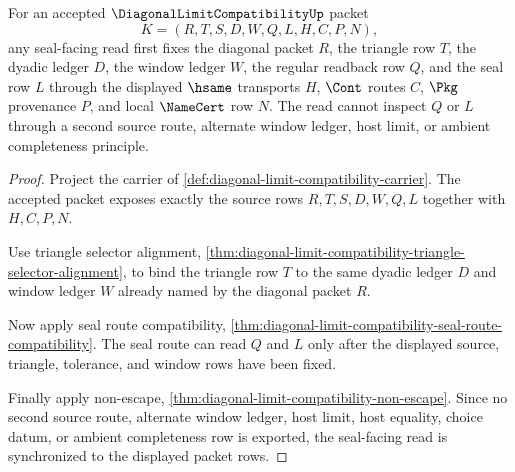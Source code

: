 \begin{theorem}
\label{thm:diagonal-limit-compatibility-seal-source-synchronization}
For an accepted $\DiagonalLimitCompatibilityUp$ packet
$$
K=(R,T,S,D,W,Q,L,H,C,P,N),
$$
any seal-facing read first fixes the diagonal packet $R$, the triangle row
$T$, the dyadic ledger $D$, the window ledger $W$, the regular readback row
$Q$, and the seal row $L$ through the displayed $\hsame$ transports $H$,
$\Cont$ routes $C$, $\Pkg$ provenance $P$, and local $\NameCert$ row $N$.
The read cannot inspect $Q$ or $L$ through a second source route, alternate
window ledger, host limit, or ambient completeness principle.
\end{theorem}
\begin{proof}
Project the carrier of
\autoref{def:diagonal-limit-compatibility-carrier}. The accepted packet
exposes exactly the source rows $R,T,S,D,W,Q,L$ together with $H,C,P,N$.

Use triangle selector alignment,
\autoref{thm:diagonal-limit-compatibility-triangle-selector-alignment}, to
bind the triangle row $T$ to the same dyadic ledger $D$ and window ledger $W$
already named by the diagonal packet $R$.

Now apply seal route compatibility,
\autoref{thm:diagonal-limit-compatibility-seal-route-compatibility}. The
seal route can read $Q$ and $L$ only after the displayed source, triangle,
tolerance, and window rows have been fixed.

Finally apply non-escape,
\autoref{thm:diagonal-limit-compatibility-non-escape}. Since no second source
route, alternate window ledger, host limit, host equality, choice datum, or
ambient completeness row is exported, the seal-facing read is synchronized to
the displayed packet rows.
\end{proof}

